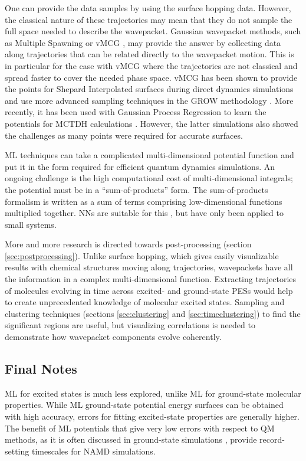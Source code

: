 \documentclass[9pt,bestpractices]{livecoms}
\begin{document}
One can provide the data samples by using the surface hopping data. However, the classical nature of these trajectories may mean that they do not sample the full space needed to describe the wavepacket. Gaussian wavepacket methods, such as Multiple Spawning \cite{RN86} or vMCG \cite{RN9}, may provide the answer by collecting data along trajectories that can be related directly to the wavepacket motion. This is in particular for the case with vMCG where the trajectories are not classical and spread faster to cover the needed phase space. vMCG has been shown to provide the points for Shepard Interpolated surfaces during direct dynamics simulations \cite{RN40, RN8} and use more advanced sampling techniques in the GROW methodology \cite{RN7}. More recently, it has been used with Gaussian Process Regression to learn the potentials for MCTDH calculations \cite{RN6}. However, the latter simulations also showed the challenges as many points were required for accurate surfaces.

ML techniques can take a complicated multi-dimensional potential function and put it in the form required for efficient quantum dynamics simulations. An ongoing challenge is the high computational cost of multi-dimensional integrals; the potential must be in a “sum-of-products” form. The sum-of-products formalism is written as a sum of terms comprising low-dimensional functions multiplied together. NNs are suitable for this \cite{RN5, RN4}, but have only been applied to small systems.

More and more research is directed towards post-processing (section \ref{sec:postprocessing}). Unlike surface hopping, which gives easily visualizable results with chemical structures moving along trajectories, wavepackets have all the information in a complex multi-dimensional function. Extracting trajectories of molecules evolving in time across excited- and ground-state PESs would help to create unprecedented knowledge of molecular excited states. Sampling and clustering techniques (sections \ref{sec:clustering} and \ref{sec:timeclustering}) to find the significant regions are useful, but visualizing correlations is needed to demonstrate how wavepacket components evolve coherently.

\subsection{Final Notes}

ML for excited states is much less explored, unlike ML for ground-state molecular properties. While ML ground-state potential energy surfaces can be obtained with high accuracy, errors for fitting excited-state properties are generally higher. The benefit of ML potentials that give very low errors with respect to QM methods, as it is often discussed in ground-state simulations \cite{RN127, RN95, Schutt21, RN126, RN93}, provide record-setting timescales for NAMD simulations.
\end{document}
